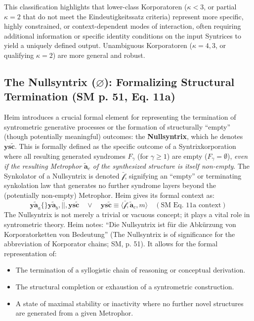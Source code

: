 \documentclass[
    12pt,              %
    a4paper,           %
    headings=normal,   %
    twoside=true,      %
    BCOR=8mm,          %
]{scrbook}
\newcommand{\q}[1]{\enquote{#1}}
\newcommand{\syntrix}{\bm{y\widetilde{a}}}
\newcommand{\metrophor}{\bm{\widetilde{a}}}
\newcommand{\synkolator}{\mathcal{f}}
\newcommand{\synkolationsstufe}{m}
\newcommand{\syndrom}{F}
\newcommand{\nullsyntrix}{\bm{ys\widetilde{c}}}
\begin{document}
This classification highlights that lower-class Korporatoren (\(\kappa < 3\), or partial \(\kappa=2\) that do not meet the Eindeutigkeitssatz criteria) represent more specific, highly constrained, or context-dependent modes of interaction, often requiring additional information or specific identity conditions on the input Syntrices to yield a uniquely defined output. Unambiguous Korporatoren (\(\kappa=4, 3\), or qualifying \(\kappa=2\)) are more general and robust.
\subsection{The Nullsyntrix (\(\varnothing\)): Formalizing Structural Termination (SM p. 51, Eq. 11a)}
\label{sec:ch3_nullsyntrix} 

Heim introduces a crucial formal element for representing the termination of syntrometric generative processes or the formation of structurally \q{empty} (though potentially meaningful) outcomes: the \textbf{Nullsyntrix}, which he denotes \(\nullsyntrix\). This is formally defined as the specific outcome of a Syntrixkorporation where all resulting generated syndromes \(\syndrom_\gamma\) (for \(\gamma \ge 1\)) are empty (\(\syndrom_\gamma = \emptyset\)), \textit{even if the resulting Metrophor \(\metrophor_c\) of the synthesized structure is itself non-empty}. The Synkolator of a Nullsyntrix is denoted \(\bar{\synkolator}\), signifying an \q{empty} or terminating synkolation law that generates no further syndrome layers beyond the (potentially non-empty) Metrophor. Heim gives its formal context as:
\begin{equation} \label{eq:original_nullsyntrix
}
\syntrix_a \{ \} \syntrix_b, \overline{||}, \nullsyntrix \quad \lor \quad \nullsyntrix \equiv \langle \bar{\synkolator}, \metrophor_c, \synkolationsstufe \rangle \quad (\text{SM Eq. 11a context})
\end{equation}
The Nullsyntrix is not merely a trivial or vacuous concept; it plays a vital role in syntrometric theory. Heim notes: \q{Die Nullsyntrix ist für die Abkürzung von Korporatorketten von Bedeutung} (The Nullsyntrix is of significance for the abbreviation of Korporator chains; SM, p. 51). It allows for the formal representation of:
\begin{itemize}
    \item   The termination of a syllogistic chain of reasoning or conceptual derivation.
    \item   The structural completion or exhaustion of a syntrometric construction.
    \item   A state of maximal stability or inactivity where no further novel structures are generated from a given Metrophor.
\end{itemize}
\end{document}
